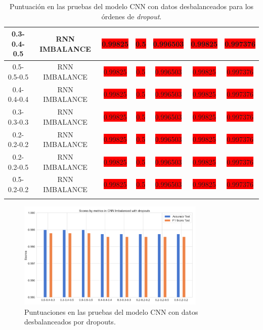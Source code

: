 \begin{longtable}{|c|c|c|c|c|c|c|}
		0.3-0.4-0.5 & RNN IMBALANCE & \colorbox{red}{0.99825} & \colorbox{red}{0.5} & \colorbox{red}{0.996503} & \colorbox{red}{0.99825} & \colorbox{red}{0.997376}\\ \hline
		0.5-0.5-0.5 & RNN IMBALANCE & \colorbox{red}{0.99825} & \colorbox{red}{0.5} & \colorbox{red}{0.996503} & \colorbox{red}{0.99825} & \colorbox{red}{0.997376}\\ \hline
		0.4-0.4-0.4 & RNN IMBALANCE & \colorbox{red}{0.99825} & \colorbox{red}{0.5} & \colorbox{red}{0.996503} & \colorbox{red}{0.99825} & \colorbox{red}{0.997376}\\ \hline
		0.3-0.3-0.3 & RNN IMBALANCE & \colorbox{red}{0.99825} & \colorbox{red}{0.5} & \colorbox{red}{0.996503} & \colorbox{red}{0.99825} & \colorbox{red}{0.997376}\\ \hline
		0.2-0.2-0.2 & RNN IMBALANCE & \colorbox{red}{0.99825} & \colorbox{red}{0.5} & \colorbox{red}{0.996503} & \colorbox{red}{0.99825} & \colorbox{red}{0.997376}\\ \hline
		0.2-0.2-0.5 & RNN IMBALANCE & \colorbox{red}{0.99825} & \colorbox{red}{0.5} & \colorbox{red}{0.996503} & \colorbox{red}{0.99825} & \colorbox{red}{0.997376}\\ \hline
		0.5-0.2-0.2 & RNN IMBALANCE & \colorbox{red}{0.99825} & \colorbox{red}{0.5} & \colorbox{red}{0.996503} & \colorbox{red}{0.99825} & \colorbox{red}{0.997376}\\ \hline
		\caption{Puntuaci\'{o}n en las pruebas del modelo CNN con datos desbalanceados para los \'{o}rdenes de \textit{dropout}.}
		\label{t:3}
	\end{longtable}

\begin{figure}[h!]
	\centering
	\includegraphics[width=0.8\textwidth]{"figuras/Experimento3/CNN_dropouts_tests"}
	\caption{Puntuaciones en las pruebas del modelo CNN con datos desbalanceados por dropouts.}
	\label{ff:1}
\end{figure}


